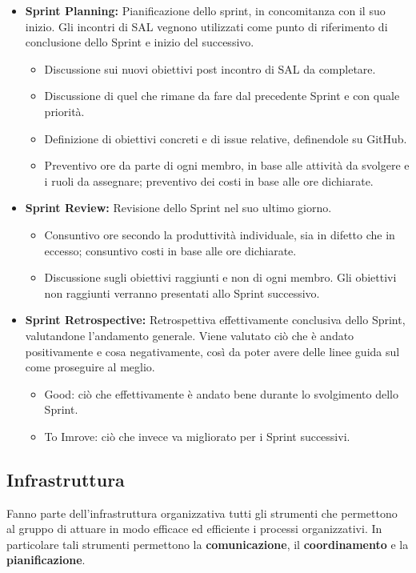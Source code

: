 \begin{itemize}
  \item{\textbf{Sprint Planning:} Pianificazione dello sprint, in concomitanza con il suo inizio. Gli incontri di SAL vegnono utilizzati come punto di riferimento di conclusione dello Sprint e inizio del successivo.}
  \begin{itemize}
    \item{Discussione sui nuovi obiettivi post incontro di SAL da completare.}
    \item{Discussione di quel che rimane da fare dal precedente Sprint e con quale priorità.}
    \item{Definizione di obiettivi concreti e di issue relative, definendole su GitHub.}
    \item{Preventivo ore da parte di ogni membro, in base alle attività da svolgere e i ruoli da assegnare; preventivo dei costi in base alle ore dichiarate.}
  \end{itemize}
  \item{\textbf{Sprint Review:} Revisione dello Sprint nel suo ultimo giorno.}
  \begin{itemize}
    \item{Consuntivo ore secondo la produttività individuale, sia in difetto che in eccesso; consuntivo costi in base alle ore dichiarate.}
    \item{Discussione sugli obiettivi raggiunti e non di ogni membro. Gli obiettivi non raggiunti verranno presentati allo Sprint successivo.}
  \end{itemize}
  \item{\textbf{Sprint Retrospective:} Retrospettiva effettivamente conclusiva dello Sprint, valutandone l'andamento generale. Viene valutato ciò che è andato positivamente e cosa negativamente, così da poter avere delle linee guida sul come proseguire al meglio.}
  \begin{itemize}
    \item{Good: ciò che effettivamente è andato bene durante lo svolgimento dello Sprint.}
    \item{To Imrove: ciò che invece va migliorato per i Sprint successivi.}
  \end{itemize}
\end{itemize} 
\subsection{Infrastruttura}\label{sec:infrastruttura}
Fanno parte dell'infrastruttura organizzativa tutti gli strumenti che permettono al gruppo di attuare in modo efficace ed efficiente i processi organizzativi. In particolare tali strumenti permettono la \textbf{comunicazione}, il \textbf{coordinamento} e la \textbf{pianificazione}.
